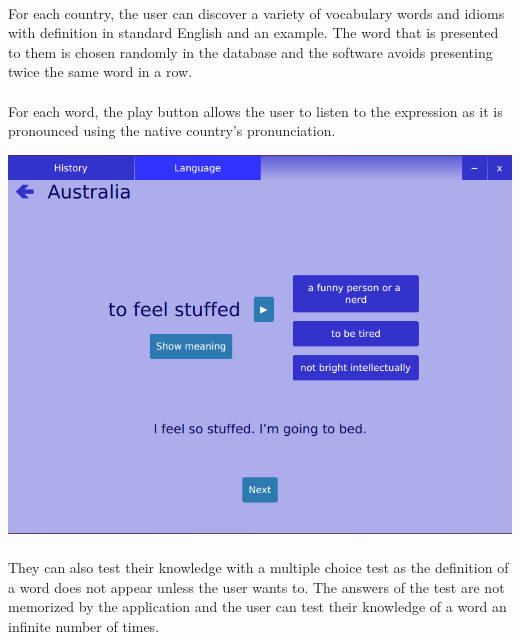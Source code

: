 \documentclass[11pt, a4paper]{report}
\begin{document}
\paragraph{}For each country, the user can discover a variety of vocabulary words and idioms with definition in standard English and an example. The word that is presented to them is chosen randomly in the database and the software avoids presenting twice the same word in a row.

\paragraph{}For each word, the play button allows the user to listen to the expression as it is pronounced using the native country's pronunciation.

\vspace{0.2cm}
\centerline{\includegraphics[scale=0.5]{images/AustraliaQuestion.png}}
\vspace{-0.35cm}

\paragraph{}They can also test their knowledge with a multiple choice test as the definition of a word does not appear unless the user wants to. The answers of the test are not memorized by the application and the user can test their knowledge of a word an infinite number of times.
\end{document}
